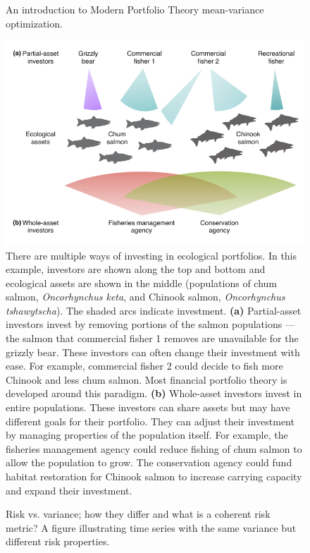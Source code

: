 \begin{figure}[htbp]
\centering
\caption{
An introduction to Modern Portfolio Theory mean-variance optimization.
}
\label{fig:mpt}
\end{figure}

\clearpage

\begin{figure}[htbp]
\centering
\includegraphics[width=5in]{salmon-portfolios.pdf}
\caption{
There are multiple ways of investing in ecological portfolios.
In this example, investors are shown along the top and bottom and ecological assets are shown in the middle (populations of chum salmon, \textit{Oncorhynchus keta}, and Chinook salmon, \textit{Oncorhynchus tshawytscha}).
The shaded arcs indicate investment.
\textbf{(a)} Partial-asset investors invest by removing portions of the salmon populations --- the salmon that commercial fisher 1 removes are unavailable for the grizzly bear.
These investors can often change their investment with ease.
For example, commercial fisher 2 could decide to fish more Chinook and less chum salmon.
Most financial portfolio theory is developed around this paradigm.
\textbf{(b)} Whole-asset investors invest in entire populations.
These investors can share assets but may have different goals for their portfolio.
They can adjust their investment by managing properties of the population itself.
For example, the fisheries management agency could reduce fishing of chum salmon to allow the population to grow.
The conservation agency could fund habitat restoration for Chinook salmon to increase carrying capacity and expand their investment.}
\label{fig:salmonport}
\end{figure}

\begin{figure}[htbp]
\centering
\caption{
Risk vs. variance; how they differ and what is a coherent risk metric?
A figure illustrating time series with the same variance but different risk properties.
}
\label{fig:risk}
\end{figure}

